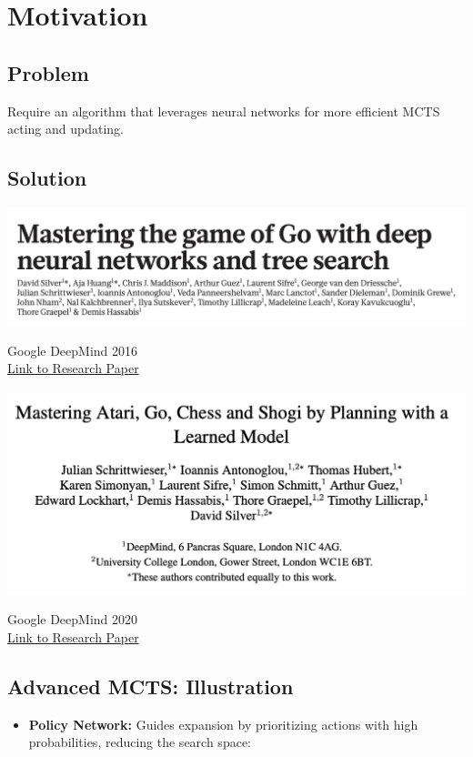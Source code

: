 \documentclass[
  letterpaper,
  DIV=11,
  numbers=noendperiod]{scrreprt}
\providecommand{\tightlist}{%
  \setlength{\itemsep}{0pt}\setlength{\parskip}{0pt}}\usepackage{longtable,booktabs,array}
\begin{document}
\section{Motivation}\label{motivation-5}

\subsection{Problem}\label{problem-4}

Require an algorithm that leverages neural networks for more efficient
MCTS acting and updating.

\subsection{Solution}\label{solution-19}

\includegraphics[width=0.6\linewidth,height=\textheight,keepaspectratio]{lecture11/images/AlphaGo.png}

Google DeepMind 2016\\
\href{https://storage.googleapis.com/deepmind-media/alphago/AlphaGoNaturePaper.pdf}{Link
to Research Paper}

\includegraphics[width=0.6\linewidth,height=\textheight,keepaspectratio]{lecture11/images/Muzero.png}

Google DeepMind 2020\\
\href{https://arxiv.org/pdf/1911.08265}{Link to Research Paper}

\subsection{Advanced MCTS:
Illustration}\label{advanced-mcts-illustration}

\begin{itemize}
\tightlist
\item
  \textbf{Policy Network:} Guides expansion by prioritizing actions with
  high probabilities, reducing the search space:
\end{itemize}
\end{document}
